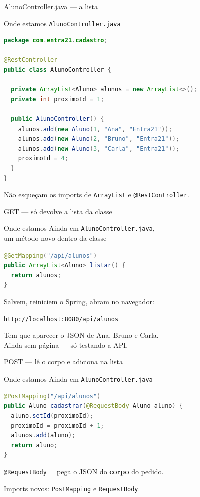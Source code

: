 \documentclass[aspectratio=169,11pt]{beamer}
\newcommand{\onde}[1]{%
  \begin{block}{Onde estamos}
    #1
  \end{block}
}
\begin{document}
\begin{frame}[fragile]{AlunoController.java --- a lista}
  \onde{\texttt{AlunoController.java}}

\begin{lstlisting}[language=Java,basicstyle=\ttfamily\footnotesize]
package com.entra21.cadastro;

@RestController
public class AlunoController {

  private ArrayList<Aluno> alunos = new ArrayList<>();
  private int proximoId = 1;

  public AlunoController() {
    alunos.add(new Aluno(1, "Ana", "Entra21"));
    alunos.add(new Aluno(2, "Bruno", "Entra21"));
    alunos.add(new Aluno(3, "Carla", "Entra21"));
    proximoId = 4;
  }
}
\end{lstlisting}

  Não esqueçam os imports de \texttt{ArrayList}
  e \texttt{@RestController}.
\end{frame}

\begin{frame}[fragile]{GET --- só devolve a lista da classe}
  \onde{Ainda em \texttt{AlunoController.java},\\
        um método novo dentro da classe}

\begin{lstlisting}[language=Java,basicstyle=\ttfamily\footnotesize]
@GetMapping("/api/alunos")
public ArrayList<Aluno> listar() {
  return alunos;
}
\end{lstlisting}

  \vspace{0.4em}
  Salvem, reiniciem o Spring, abram no navegador:

  \vspace{0.3em}
  \texttt{http://localhost:8080/api/alunos}

  \vspace{0.4em}
  Tem que aparecer o JSON de Ana, Bruno e Carla.\\
  Ainda sem página --- só testando a API.
\end{frame}

\begin{frame}[fragile]{POST --- lê o corpo e adiciona na lista}
  \onde{Ainda em \texttt{AlunoController.java}}

\begin{lstlisting}[language=Java,basicstyle=\ttfamily\footnotesize]
@PostMapping("/api/alunos")
public Aluno cadastrar(@RequestBody Aluno aluno) {
  aluno.setId(proximoId);
  proximoId = proximoId + 1;
  alunos.add(aluno);
  return aluno;
}
\end{lstlisting}

  \vspace{0.3em}
  \texttt{@RequestBody} = pega o JSON do \textbf{corpo} do pedido.

  \vspace{0.3em}
  Imports novos: \texttt{PostMapping} e \texttt{RequestBody}.
\end{frame}
\end{document}
